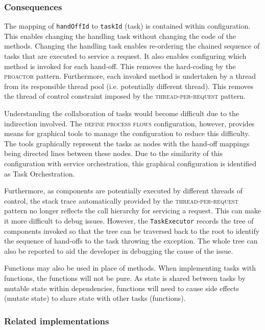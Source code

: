 \documentclass[prodmode]{style/acmlarge}
\begin{document}
\subsubsection*{Consequences}

The mapping of \texttt{handOffId} to \texttt{taskId} (task) is contained within
configuration.  This enables changing the handling task without changing the
code of the methods.  Changing the handling task enables re-ordering the chained
sequence of tasks that are executed to service a request.  It also enables
configuring which method is invoked for each hand-off.  This removes the
hard-coding by the \textsc{proactor} pattern.   Furthermore, each invoked method
is undertaken by a thread from its responsible thread pool (i.e.
potentially different thread).  This removes the thread of control constraint
imposed by the \textsc{thread-per-request} pattern.

Understanding the collaboration of tasks would become difficult due to the
indirection involved.  The \textsc{define process flows} configuration, however,
provides means for graphical tools to manage the configuration to reduce this
difficulty.  The tools graphically represent the tasks as nodes with the
hand-off mappings being directed lines between these nodes.  Due to the
similarity of this configuration with service orchestration, this graphical
configuration is identified as Task Orchestration.

Furthermore, as components are potentially executed by different threads of
control, the stack trace automatically provided by the
\textsc{thread-per-request} pattern no longer reflects the call hierarchy for
servicing a request.  This can make it more difficult to debug issues.  However,
the \texttt{TaskExecutor} records the tree of components invoked so that the
tree can be traversed back to the root to identify the sequence of hand-offs to
the task throwing the exception.  The whole tree can also be reported to aid the
developer in debugging the cause of the issue.

Functions may also be used in place of methods.  When implementing tasks with
functions, the functions will not be pure.  As state is shared between tasks by
mutable state within dependencies, functions will need to cause side effects
(mutate state) to share state with other tasks (functions).



\subsubsection*{Related implementations}
\end{document}
